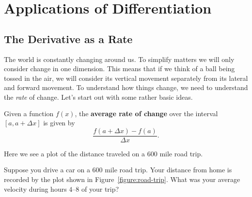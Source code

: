 \chapter{Applications of Differentiation}

\section{The Derivative as a Rate}

The world is constantly changing around us. To simplify matters we
will only consider change in one dimension. This means that if we
think of a ball being tossed in the air, we will consider its vertical
movement separately from its lateral and forward movement.  To
understand how things change, we need to understand the \textit{rate}
of change. Let's start out with some rather basic ideas.

\begin{definition}
Given a function $f(x)$, the \textbf{average rate of change} over the
interval $[a, a+\Delta x]$ is given by
\[
\frac{f(a+\Delta x) - f(a)}{\Delta x}.
\]
\end{definition}
\begin{marginfigure}
\caption{Here we see a plot of the distance traveled on a $600$ mile road trip.}
\label{figure:road-trip}
\end{marginfigure}

\begin{example}
Suppose you drive a car on a $600$ mile road trip. Your distance from
home is recorded by the plot shown in
Figure~\ref{figure:road-trip}. What was your average velocity during
hours $4$--$8$ of your trip?
\end{example}

